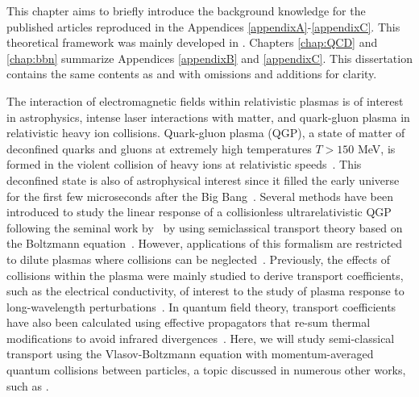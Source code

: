 This chapter aims to briefly introduce the background knowledge for the published articles reproduced in the Appendices \ref{appendixA}-\ref{appendixC}. This theoretical framework was mainly developed in  \cite{Formanek:2021blc}. Chapters \ref{chap:QCD} and \ref{chap:bbn} summarize Appendices \ref{appendixB} and \ref{appendixC}. This dissertation contains the same contents as \cite{Grayson:2022asf} and \cite{Grayson:2023flr} with omissions and additions for clarity.

The interaction of electromagnetic fields within relativistic plasmas is of interest in astrophysics, intense laser interactions with matter, and quark-gluon plasma in relativistic heavy ion collisions. Quark-gluon plasma (QGP), a state of matter of deconfined quarks and gluons at extremely high temperatures $T>150$ MeV, is formed in the violent collision of heavy ions at relativistic speeds~\cite{Letessier:2002ony}. This deconfined state is also of astrophysical interest since it filled the early universe for the first few microseconds after the Big Bang~\cite{rafelski2013connecting}. Several methods have been introduced to study the linear response of a collisionless ultrarelativistic QGP following the seminal work by~\cite{Weldon:1982aq} by using semiclassical transport theory based on the Boltzmann equation~\cite{Mrowczynski:1987jr,Mrowczynski:1989np,Blaizot:1993zk,Kelly:1994ig,Kelly:1994dh}. However, applications of this formalism are restricted to dilute plasmas where collisions can be neglected~\cite{Blaizot:2001nr}. 
Previously, the effects of collisions within the plasma were mainly studied to derive transport coefficients, such as the electrical conductivity, of interest to the study of plasma response to long-wavelength perturbations~\cite{Mrowczynski:1988xu,Heiselberg:1993cr,Ahonen:1996nq,Baym:1997gq,Ahonen:1998iz}. In quantum field theory, transport coefficients have also been calculated using effective propagators that re-sum thermal modifications to avoid infrared divergences~\cite{Heiselberg:1994ms,Arnold:2002zm,Arnold:2003zc}. Here, we will study semi-classical transport using the Vlasov-Boltzmann equation with momentum-averaged quantum collisions between particles, a topic discussed in numerous other works, such as \cite{DeGroot:1980dk,Cercignani2002,Hakim2011,Carrington:2003je,Schenke:2006xu}.


